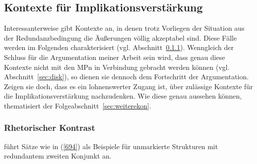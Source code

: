 \subsection{Kontexte für Implikationsverstärkung}
Interessanterweise gibt \citet{Horn1991} Kontexte an, in denen trotz Vorliegen der Situation aus der Redundanzbedingung die Äußerungen völlig akzeptabel sind. Diese Fälle werden im Folgenden charakterisiert (vgl. Abschnitt~\ref{sec:kontrast}). Wenn\-gleich der Schluss für die Argumentation meiner Arbeit sein wird, dass genau diese Kontexte nicht mit den MPn in Verbindung gebracht werden können (vgl. Abschnitt~\ref{sec:disk}), so dienen sie dennoch dem Fortschritt der Argumentation. Zeigen sie doch, dass es ein lohnenswerter Zugang ist, über zulässige Kontexte für die Implikationsverstärkung nachzudenken. Wie diese genau aussehen können, thematisiert der Folgeabschnitt~\ref{sec:weiterekon}.

\subsubsection{Rhetorischer Kontrast}
\label{sec:kontrast}
\citet{Horn1991} führt Sätze wie in (\ref{694}) als Beispiele für unmarkierte Strukturen mit redundantem zweiten Konjunkt an.


